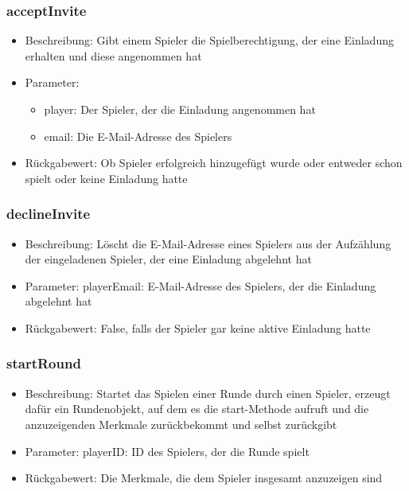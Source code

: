 \documentclass[a4paper]{scrreprt}
\begin{document}
    \subsubsection{acceptInvite}
    \begin{itemize}
        \item Beschreibung: Gibt einem Spieler die Spielberechtigung, der eine Einladung erhalten und diese angenommen hat
        \item Parameter:
        \begin{itemize}
            \item player: Der Spieler, der die Einladung angenommen hat
            \item email: Die E-Mail-Adresse des Spielers
        \end{itemize}
        \item Rückgabewert: Ob Spieler erfolgreich hinzugefügt wurde oder entweder schon spielt oder keine Einladung hatte
    \end{itemize}
    \subsubsection{declineInvite}
    \begin{itemize}
        \item Beschreibung: Löscht die E-Mail-Adresse eines Spielers aus der Aufzählung der eingeladenen Spieler, der eine Einladung abgelehnt hat
        \item Parameter: playerEmail: E-Mail-Adresse des Spielers, der die Einladung abgelehnt hat
        \item Rückgabewert: False, falls der Spieler gar keine aktive Einladung hatte
    \end{itemize}
    \subsubsection{startRound}
    \begin{itemize}
        \item Beschreibung: Startet das Spielen einer Runde durch einen Spieler, erzeugt dafür ein Rundenobjekt, auf dem es die start-Methode aufruft und die anzuzeigenden Merkmale zurückbekommt und selbst zurückgibt
        \item Parameter: playerID: ID des Spielers, der die Runde spielt
        \item Rückgabewert: Die Merkmale, die dem Spieler insgesamt anzuzeigen sind
    \end{itemize}
\end{document}
